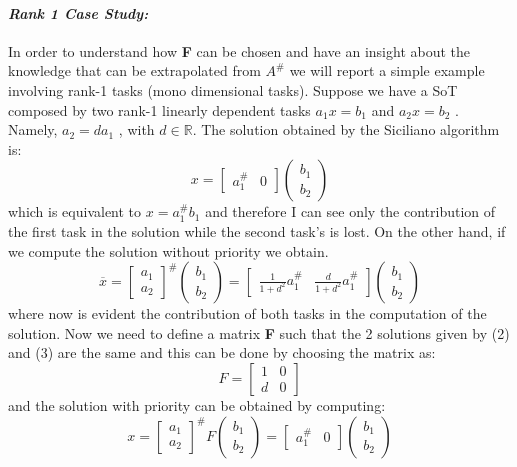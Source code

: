 \documentclass[12pt, a4paper]{article}
\newcommand{\R}{\mathbb{R}}
\begin{document}
\paragraph{\textit{Rank 1 Case Study:}}
In order to understand how \textbf{F} can be chosen and have an insight about the knowledge that can be extrapolated from $A^\#$  we will report a simple example involving rank-1 tasks (mono dimensional tasks).
Suppose we have a SoT composed by two rank-1 linearly dependent tasks $a_1x = b_1$ and $a_2x = b_2$ . Namely, $a_2 = da_1$ , with $d \in \R$.
The solution obtained by the Siciliano algorithm is:\[
x=\begin{bmatrix}
a_1^\# & 0 
\end{bmatrix}
\begin{pmatrix}
b_1 \\ b_2
\end{pmatrix}
\]
which is equivalent to $x = a_1^\#b_1$ and therefore I can see only the contribution of the first task in the solution while the second task’s is lost.
On the other hand, if we compute the solution without priority we obtain.
\[
\overline{x} = 
\begin{bmatrix}
a_1 \\ a_2
\end{bmatrix}^\#
\begin{pmatrix}
b_1 \\ b_2
\end{pmatrix} = 
\begin{bmatrix}
\frac{1}{1+d^2}a_1^\# & \frac{d}{1+d^2}a_1^\#
\end{bmatrix}
\begin{pmatrix}
b_1 \\ b_2
\end{pmatrix}
\]
where now is evident the contribution of both tasks in the computation of the solution.
Now we need to define a matrix \textbf{F}  such that the 2 solutions given by (2) and (3) are the same and this can be done by choosing the matrix as:
\[
F = \begin{bmatrix}
1 & 0 \\ d & 0
\end{bmatrix}
\]
and the solution with priority can be obtained by computing:
\[
x = 
\begin{bmatrix}
a_1 \\ a_2
\end{bmatrix}^\#F
\begin{pmatrix}
b_1 \\ b_2
\end{pmatrix}
=\begin{bmatrix}
a_1^\# & 0 
\end{bmatrix}
\begin{pmatrix}
b_1 \\ b_2
\end{pmatrix}
\]
\end{document}
